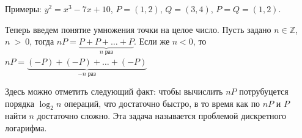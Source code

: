 \documentclass[a4paper,12pt]{article}
\begin{document}
        Примеры: $y^2 = x^3 - 7x + 10$, $P = (1, 2)$, $Q = (3, 4)$, $P = Q = (1, 2)$.

        Теперь введем понятие умножения точки на целое число. Пусть задано $n \in \mathbb{Z}$, $n~>~0$, тогда $nP = \underbrace{P + P + \dots + P}_{n\;\text{раз}}$. 
        Если же $n < 0$, то $nP = \underbrace{(-P) + (-P) + \dots + (-P)}_{-n \; \text{раз}}$

        Здесь можно отметить следующий факт: чтобы вычислить $nP$ потрубуцется порядка $\log_2{n}$ операций, что достаточно быстро, в
        то время как по $nP$ и $P$ найти $n$ достаточно сложно. Эта задача называется проблемой дискретного логарифма.
\end{document}
